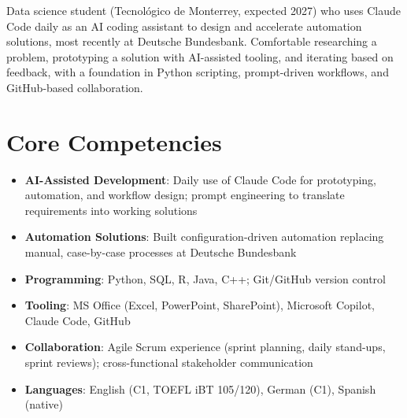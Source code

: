 \documentclass[11pt,a4paper,sans]{moderncv}
\begin{document}
\makecvtitle


\vspace{6pt}
\small{Data science student (Tecnológico de Monterrey, expected 2027) who uses Claude Code daily as an AI coding assistant to design and accelerate automation solutions, most recently at Deutsche Bundesbank. Comfortable researching a problem, prototyping a solution with AI-assisted tooling, and iterating based on feedback, with a foundation in Python scripting, prompt-driven workflows, and GitHub-based collaboration.}


\section{Core Competencies}
\vspace{1pt}
\begin{itemize}

\item \textbf{AI-Assisted Development}: Daily use of Claude Code for prototyping, automation, and workflow design; prompt engineering to translate requirements into working solutions

\item \textbf{Automation Solutions}: Built configuration-driven automation replacing manual, case-by-case processes at Deutsche Bundesbank

\item \textbf{Programming}: Python, SQL, R, Java, C++; Git/GitHub version control

\item \textbf{Tooling}: MS Office (Excel, PowerPoint, SharePoint), Microsoft Copilot, Claude Code, GitHub

\item \textbf{Collaboration}: Agile Scrum experience (sprint planning, daily stand-ups, sprint reviews); cross-functional stakeholder communication

\item \textbf{Languages}: English (C1, TOEFL iBT 105/120), German (C1), Spanish (native)

\end{itemize}
\end{document}
